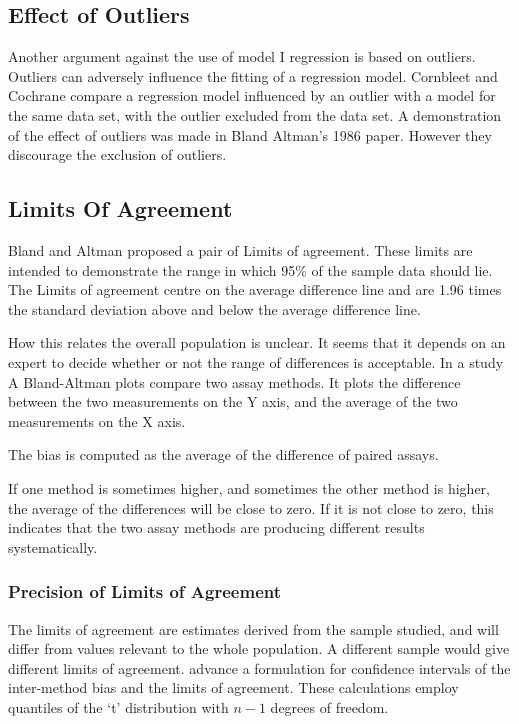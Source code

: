 \documentclass[12pt, a4paper]{report}
\begin{document}
	\subsection{Effect of Outliers} Another argument against
	the use of model I regression is based on outliers. Outliers can
	adversely influence the fitting of a regression model. Cornbleet
	and Cochrane compare a regression model influenced by an outlier
	with a model for the same data set, with the outlier excluded from
	the data set. A demonstration of the effect of outliers was made
	in Bland Altman's 1986 paper. However they discourage the
	exclusion of outliers.
	
	\subsection{Limits Of Agreement}
	Bland and Altman proposed a pair of Limits of agreement. These
	limits are intended to demonstrate the range in which 95\% of the
	sample data should lie. The Limits of agreement centre on the
	average difference line and are 1.96 times the standard deviation
	above and below the average difference line.
	
	How this relates the overall population is unclear. It seems that
	it depends on an expert to decide whether or not the range of
	differences is acceptable. In a study A Bland-Altman plots compare
	two assay methods. It plots the difference between the two
	measurements on the Y axis, and the average of the two
	measurements on the X axis.
	
	The bias is computed as the average of the difference of paired
	assays.
	
	If one method is sometimes higher, and sometimes the other method
	is higher, the average of the differences will be close to zero.
	If it is not close to zero, this indicates that the two assay
	methods are producing different results systematically.
	
	\subsubsection{Precision of Limits of Agreement}
	The limits of agreement are estimates derived from the sample
	studied, and will differ from values relevant to the whole
	population. A different sample would give different limits of
	agreement. \citet*{BA86} advance a formulation for confidence
	intervals of the inter-method bias and the limits of agreement.
	These calculations employ quantiles of the `t' distribution with
	$n -1$ degrees of freedom.
	
\end{document}
